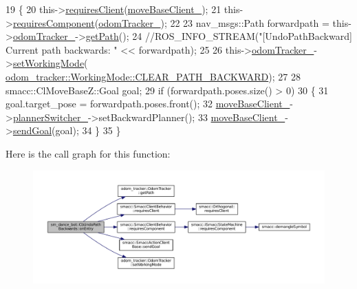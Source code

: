 \begin{DoxyCode}
19   \{
20     this->\hyperlink{classsmacc_1_1SmaccClientBehavior_adc21bbd45d36bd81ca6f778ed161807a}{requiresClient}(\hyperlink{classsm__dance__bot_1_1CbUndoPathBackwards_a2e134a879373ea9d29d04f72f707cbc8}{moveBaseClient\_});
21     this->\hyperlink{classsmacc_1_1SmaccClientBehavior_a011246bb1424f8bf8c9322f652db9d88}{requiresComponent}(\hyperlink{classsm__dance__bot_1_1CbUndoPathBackwards_a75335993a9cd613c7aba93ccb518c645}{odomTracker\_});
22 
23     nav\_msgs::Path forwardpath = this->\hyperlink{classsm__dance__bot_1_1CbUndoPathBackwards_a75335993a9cd613c7aba93ccb518c645}{odomTracker\_}->\hyperlink{classodom__tracker_1_1OdomTracker_a33cb7ab3947b27bf61fabb5be2dd87c9}{getPath}();
24     \textcolor{comment}{//ROS\_INFO\_STREAM("[UndoPathBackward] Current path backwards: " << forwardpath);}
25 
26     this->\hyperlink{classsm__dance__bot_1_1CbUndoPathBackwards_a75335993a9cd613c7aba93ccb518c645}{odomTracker\_}->\hyperlink{classodom__tracker_1_1OdomTracker_ac001a40d1107ef0d88aa7db03cafb08c}{setWorkingMode}(
      \hyperlink{namespaceodom__tracker_a4daf27fd157b1a481fdfd6f90de00b88a0cf8f27617189e35619df3c18bda6274}{odom\_tracker::WorkingMode::CLEAR\_PATH\_BACKWARD});
27 
28     smacc::ClMoveBaseZ::Goal goal;
29     \textcolor{keywordflow}{if} (forwardpath.poses.size() > 0)
30     \{
31       goal.target\_pose = forwardpath.poses.front();
32       \hyperlink{classsm__dance__bot_1_1CbUndoPathBackwards_a2e134a879373ea9d29d04f72f707cbc8}{moveBaseClient\_}->\hyperlink{classsmacc_1_1ClMoveBaseZ_a712e0df77c9629930e03cbb4c539b485}{plannerSwitcher\_}->setBackwardPlanner();
33       \hyperlink{classsm__dance__bot_1_1CbUndoPathBackwards_a2e134a879373ea9d29d04f72f707cbc8}{moveBaseClient\_}->\hyperlink{classsmacc_1_1SmaccActionClientBase_a58c67a87c5fb8ea1633573c58fe3eee1}{sendGoal}(goal);
34     \}
35   \}
\end{DoxyCode}


Here is the call graph for this function\+:
\nopagebreak
\begin{figure}[H]
\begin{center}
\leavevmode
\includegraphics[width=350pt]{classsm__dance__bot_1_1CbUndoPathBackwards_a5ecdf83df96ab3d74eb4e4febea7fa74_cgraph}
\end{center}
\end{figure}


